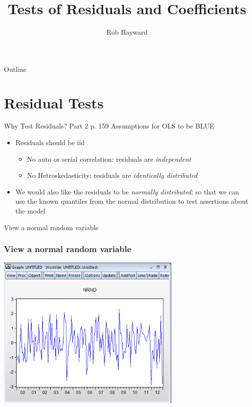 \documentclass[14pt,xcolor=pdftex,dvipsnames,table]{beamer}\usepackage[]{graphicx}\usepackage[]{color}
\title{Tests of Residuals and Coefficients}
\author{Rob Hayward}
\begin{document}
\begin{frame}
\titlepage
\end{frame}

\begin{frame}{Outline}
\tableofcontents
\end{frame}

\section{Residual Tests}
Why Test Residuals? Part 2 p. 159
Assumptions for OLS to be BLUE
\begin{itemize}[<+-| alert@+>]
\item Residuals should be iid
\begin{itemize}
\item No auto or serial correlation: residuals are \emph{independent}
\item No Hetroskedasticity: residuals are \emph{identically distributed}
\end{itemize}
\item We would also like the residuals to be \emph{normally distributed}: so that we can use the known quantiles from the normal distribution to test assertions about the model
\end{itemize}


\begin{frame}{View a normal random variable}
\graphicspath{{./Figures/}}
\frametitle{View a normal random variable}
\begin{center}
\includegraphics[height = 3.0in]{NRND}
\end{center}
\end{frame}
\end{document}
